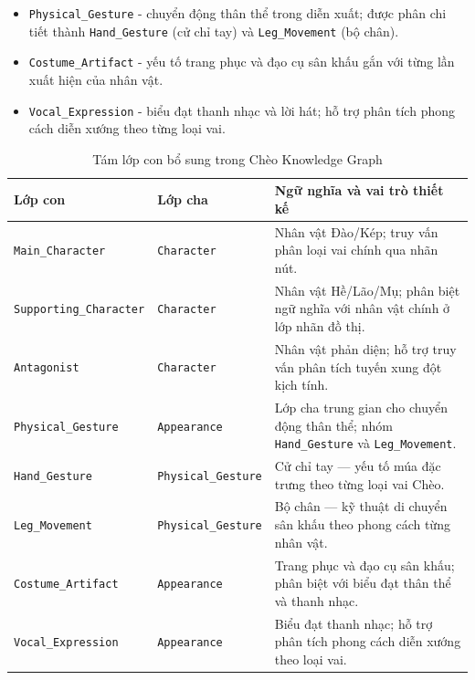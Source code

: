 \begin{itemize}
  \item \texttt{Physical\_Gesture} - chuyển động thân thể trong diễn xuất; được
    phân chi tiết thành \texttt{Hand\_Gesture} (cử chỉ tay) và
    \texttt{Leg\_Movement} (bộ chân).
  \item \texttt{Costume\_Artifact} - yếu tố trang phục và đạo cụ sân khấu gắn
    với từng lần xuất hiện của nhân vật.
  \item \texttt{Vocal\_Expression} - biểu đạt thanh nhạc và lời hát; hỗ trợ
    phân tích phong cách diễn xướng theo từng loại vai.
\end{itemize}

\begin{table}[ht]
  \centering
  \caption{Tám lớp con bổ sung trong Chèo Knowledge Graph}
  \label{tab:schema_extension}
  \renewcommand{\arraystretch}{1.3}
  \footnotesize
  \begin{tabular}{p{4.0cm} p{3.2cm} p{7.59cm}}
    \toprule
    \textbf{Lớp con} & \textbf{Lớp cha} & \textbf{Ngữ nghĩa và vai trò thiết kế} \\
    \midrule
    \texttt{Main\_Character}
      & \texttt{Character}
      & Nhân vật Đào/Kép; truy vấn phân loại vai chính qua nhãn nút. \\[2pt]
    \texttt{Supporting\_Character}
      & \texttt{Character}
      & Nhân vật Hề/Lão/Mụ; phân biệt ngữ nghĩa với nhân vật chính ở lớp
        nhãn đồ thị. \\[2pt]
    \texttt{Antagonist}
      & \texttt{Character}
      & Nhân vật phản diện; hỗ trợ truy vấn phân tích tuyến xung đột
        kịch tính. \\[4pt]
    \texttt{Physical\_Gesture}
      & \texttt{Appearance}
      & Lớp cha trung gian cho chuyển động thân thể; nhóm \texttt{Hand\_Gesture}
        và \texttt{Leg\_Movement}. \\[2pt]
    \texttt{Hand\_Gesture}
      & \texttt{Physical\_Gesture}
      & Cử chỉ tay --- yếu tố múa đặc trưng theo từng loại vai Chèo. \\[2pt]
    \texttt{Leg\_Movement}
      & \texttt{Physical\_Gesture}
      & Bộ chân --- kỹ thuật di chuyển sân khấu theo phong cách từng nhân vật. \\[2pt]
    \texttt{Costume\_Artifact}
      & \texttt{Appearance}
      & Trang phục và đạo cụ sân khấu; phân biệt với biểu đạt thân thể và
        thanh nhạc. \\[2pt]
    \texttt{Vocal\_Expression}
      & \texttt{Appearance}
      & Biểu đạt thanh nhạc; hỗ trợ phân tích phong cách diễn xướng theo
        loại vai. \\
    \bottomrule
  \end{tabular}
\end{table}

